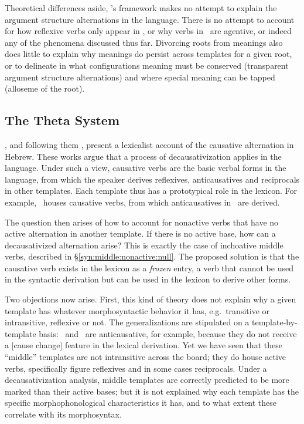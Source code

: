 Theoretical differences aside, \citeauthor{aronoff94}'s framework makes no attempt to explain the argument structure alternations in the language. There is no attempt to account for how reflexive verbs only appear in \thit, or why verbs in \tpie~are agentive, or indeed any of the phenomena discussed thus far. Divorcing roots from meanings also does little to explain why meanings do persist across templates for a given root, or to delineate in what configurations meaning must be conserved (transparent argument structure alternations) and where special meaning can be tapped (alloseme of the root).
	
	\subsection{The Theta System \citep{reinhartsiloni05,laks11}}\label{syn:other-stem:reinhart}
\cite{reinhartsiloni05}, and following them \cite{laks11,laks13ws,laks13morpho,laks14}, present a lexicalist account of the causative alternation in Hebrew. These works argue that a process of decausativization applies in the language. Under such a view, causative verbs are the basic verbal forms in the language, from which the speaker derives reflexives, anticausatives and reciprocals in other templates. Each template thus has a prototypical role in the lexicon. For example, \tpie~houses causative verbs, from which anticausatives in \thit~are derived.

The question then arises of how to account for nonactive verbs that have no active alternation in another template. If there is no active base, how can a decausativized alternation arise? This is exactly the case of inchoative middle verbs, described in \S\ref{syn:middle:nonactive:null}. The proposed solution is that the causative verb exists in the lexicon as a \emph{frozen} entry, a verb that cannot be used in the syntactic derivation but can be used in the lexicon to derive other forms.

Two objections now arise. First, this kind of theory does not explain why a given template has whatever morphosyntactic behavior it has, e.g.~transitive or intransitive, reflexive or not. The generalizations are stipulated on a template-by-template basis: \tnif~and \thit~are anticausative, for example, because they do not receive a [cause change] feature in the lexical derivation. Yet we have seen that these ``middle'' templates are not intransitive across the board; they do house active verbs, specifically figure reflexives and in some cases reciprocals. Under a decausativization analysis, middle templates are correctly predicted to be more marked than their active bases; but it is not explained why each template has the specific morphophonological characteristics it has, and to what extent these correlate with its morphosyntax.

